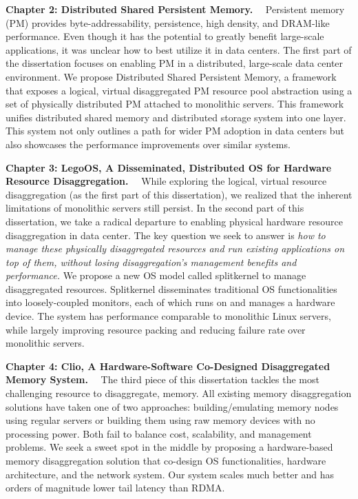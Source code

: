 \textbf{Chapter 2: Distributed Shared Persistent Memory.}~~
Persistent memory (PM) provides byte-addressability, persistence, high density, and DRAM-like performance.
Even though it has the potential to greatly benefit large-scale 
applications, it was unclear how to best utilize it in data centers.
%
The first part of the dissertation focuses on enabling PM in a distributed, large-scale data center environment.
%
We propose Distributed Shared Persistent Memory,
a framework that exposes a logical, virtual disaggregated PM resource pool abstraction using a set of physically distributed PM attached to monolithic servers.
This framework unifies distributed shared memory and distributed storage system into one layer.
%
This system not only outlines a path for wider PM adoption in data centers but also showcases the performance improvements over similar systems.

\textbf{Chapter 3: LegoOS, A Disseminated, Distributed OS for
Hardware Resource Disaggregation.}~~
While exploring the logical, virtual resource disaggregation (as the first part of this dissertation),
we realized that the inherent limitations of monolithic servers still persist.
In the second part of this dissertation, we take a radical departure to
enabling physical hardware resource disaggregation in data center.
%
The key question we seek to answer is \textit{how to manage these physically disaggregated resources and run existing applications on top of them, without losing disaggregation's management benefits and performance.}
%
We propose a new OS model called splitkernel to manage disaggregated resources.
Splitkernel disseminates traditional OS functionalities into loosely-coupled
monitors, each of which runs on and manages a hardware device.
The system has performance comparable to monolithic Linux servers,
while largely improving resource packing and reducing failure rate
over monolithic servers.

\textbf{Chapter 4: Clio, A Hardware-Software Co-Designed Disaggregated Memory System.}~~
The third piece of this dissertation tackles
the most challenging resource to disaggregate, memory.
All existing memory disaggregation solutions have taken one of two approaches:
building/emulating memory nodes using regular servers or
building them using raw memory devices with no processing power.
%
Both fail to balance cost, scalability, and management problems.
%
We seek a sweet spot in the middle by proposing a hardware-based
memory disaggregation solution that co-design OS functionalities,
hardware architecture, and the network system.
Our system scales much better and has orders of magnitude lower
tail latency than RDMA.

